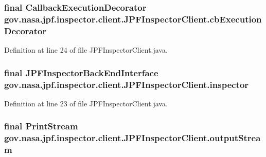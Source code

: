 \subsubsection[{\texorpdfstring{cb\+Execution\+Decorator}{cbExecutionDecorator}}]{\setlength{\rightskip}{0pt plus 5cm}final {\bf Callback\+Execution\+Decorator} gov.\+nasa.\+jpf.\+inspector.\+client.\+J\+P\+F\+Inspector\+Client.\+cb\+Execution\+Decorator\hspace{0.3cm}{\ttfamily [private]}}\hypertarget{classgov_1_1nasa_1_1jpf_1_1inspector_1_1client_1_1_j_p_f_inspector_client_a6d747cd310776005b1fe089ddfd45d82}{}\label{classgov_1_1nasa_1_1jpf_1_1inspector_1_1client_1_1_j_p_f_inspector_client_a6d747cd310776005b1fe089ddfd45d82}


Definition at line 24 of file J\+P\+F\+Inspector\+Client.\+java.

\subsubsection[{\texorpdfstring{inspector}{inspector}}]{\setlength{\rightskip}{0pt plus 5cm}final {\bf J\+P\+F\+Inspector\+Back\+End\+Interface} gov.\+nasa.\+jpf.\+inspector.\+client.\+J\+P\+F\+Inspector\+Client.\+inspector\hspace{0.3cm}{\ttfamily [private]}}\hypertarget{classgov_1_1nasa_1_1jpf_1_1inspector_1_1client_1_1_j_p_f_inspector_client_aabfafb813aa9477130494c647d5ab2d8}{}\label{classgov_1_1nasa_1_1jpf_1_1inspector_1_1client_1_1_j_p_f_inspector_client_aabfafb813aa9477130494c647d5ab2d8}


Definition at line 23 of file J\+P\+F\+Inspector\+Client.\+java.

\subsubsection[{\texorpdfstring{output\+Stream}{outputStream}}]{\setlength{\rightskip}{0pt plus 5cm}final Print\+Stream gov.\+nasa.\+jpf.\+inspector.\+client.\+J\+P\+F\+Inspector\+Client.\+output\+Stream\hspace{0.3cm}{\ttfamily [private]}}\hypertarget{classgov_1_1nasa_1_1jpf_1_1inspector_1_1client_1_1_j_p_f_inspector_client_ad5e02cdfa86797b3d16ab288e041b349}{}\label{classgov_1_1nasa_1_1jpf_1_1inspector_1_1client_1_1_j_p_f_inspector_client_ad5e02cdfa86797b3d16ab288e041b349}


